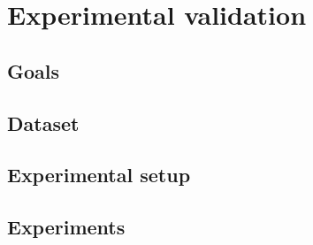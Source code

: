 \chapter{Experimental validation}
\label{chapter5}
\thispagestyle{empty}

\section{Goals}


\section{Dataset}


\section{Experimental setup}


\section{Experiments}

